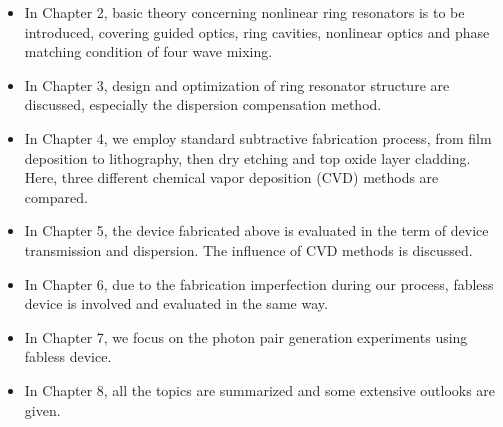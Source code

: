 \begin{itemize}
	\item In Chapter 2, basic theory concerning nonlinear ring resonators is to be introduced, covering guided optics, ring cavities, nonlinear optics and phase matching condition of four wave mixing.
	\item In Chapter 3, design and optimization of ring resonator structure are discussed, especially the dispersion compensation method.
	\item In Chapter 4, we employ standard subtractive fabrication process, from film deposition to lithography, then dry etching and top oxide layer cladding. Here, three different chemical vapor deposition (CVD) methods are compared.
	\item In Chapter 5, the device fabricated above is evaluated in the term of device transmission and dispersion. The influence of CVD methods is discussed.
	\item In Chapter 6, due to the fabrication imperfection during our process, fabless device is involved and evaluated in the same way.
	\item In Chapter 7, we focus on the photon pair generation experiments using fabless device.
	\item In Chapter 8, all the topics are summarized and some extensive outlooks are given.
\end{itemize}